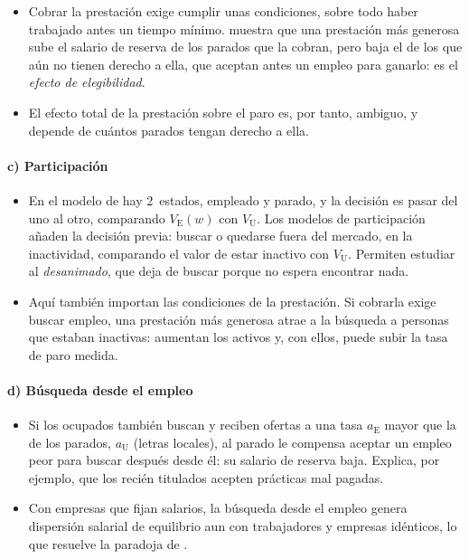 \documentclass[11pt]{article}
\begin{document}
\begin{itemize}
\item Cobrar la prestación exige cumplir unas condiciones, sobre todo haber trabajado antes un tiempo mínimo. \textcite{Mortensen1977Unemployment} muestra que una prestación más generosa sube el salario de reserva de los parados que la cobran, pero baja el de los que aún no tienen derecho a ella, que aceptan antes un empleo para ganarlo: es el \emph{efecto de elegibilidad}.
\item El efecto total de la prestación sobre el paro es, por tanto, ambiguo, y depende de cuántos parados tengan derecho a ella.
\end{itemize}

\paragraph{c) Participación}

\begin{itemize}
\item En el modelo de  hay 2~estados, empleado y parado, y la decisión es pasar del uno al otro, comparando $V_{\mathrm E}(w)$ con $V_{\mathrm U}$. Los modelos de participación añaden la decisión previa: buscar o quedarse fuera del mercado, en la inactividad, comparando el valor de estar inactivo con $V_{\mathrm U}$. Permiten estudiar al \emph{desanimado}, que deja de buscar porque no espera encontrar nada.
\item Aquí también importan las condiciones de la prestación. Si cobrarla exige buscar empleo, una prestación más generosa atrae a la búsqueda a personas que estaban inactivas: aumentan los activos y, con ellos, puede subir la tasa de paro medida.
\end{itemize}

\paragraph{d) Búsqueda desde el empleo}

\begin{itemize}
\item Si los ocupados también buscan\nocite{Burdett1978Theory} y reciben ofertas a una tasa $a_{\mathrm E}$ mayor que la de los parados, $a_{\mathrm U}$ (letras locales), al parado le compensa aceptar un empleo peor para buscar después desde él: su salario de reserva baja. Explica, por ejemplo, que los recién titulados acepten prácticas mal pagadas.
\item Con empresas que fijan salarios, la búsqueda desde el empleo genera dispersión salarial de equilibrio aun con trabajadores y empresas idénticos, lo que resuelve la paradoja de \nocite{BurdettMortensen1998Wage}.
\end{itemize}
\end{document}
